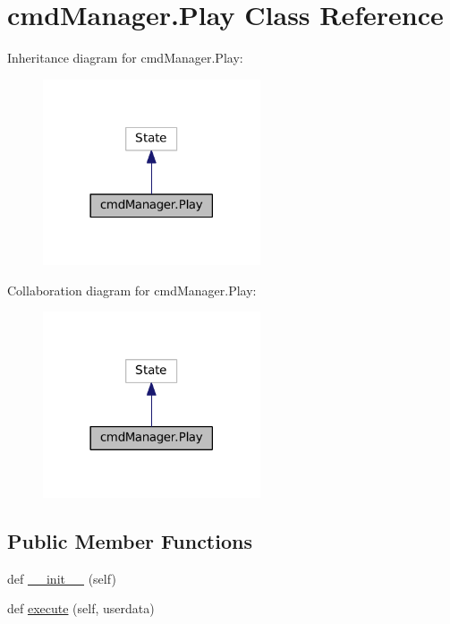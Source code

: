 \hypertarget{classcmdManager_1_1Play}{}\section{cmd\+Manager.\+Play Class Reference}
\label{classcmdManager_1_1Play}


Inheritance diagram for cmd\+Manager.\+Play\+:\nopagebreak
\begin{figure}[H]
\begin{center}
\leavevmode
\includegraphics[width=182pt]{classcmdManager_1_1Play__inherit__graph}
\end{center}
\end{figure}


Collaboration diagram for cmd\+Manager.\+Play\+:\nopagebreak
\begin{figure}[H]
\begin{center}
\leavevmode
\includegraphics[width=182pt]{classcmdManager_1_1Play__coll__graph}
\end{center}
\end{figure}
\subsection*{Public Member Functions}
\begin{DoxyCompactItemize}
\item 
def \hyperlink{classcmdManager_1_1Play_a4d2579c5fbfe43cfbeb085a149813ed3}{\+\_\+\+\_\+init\+\_\+\+\_\+} (self)
\item 
def \hyperlink{classcmdManager_1_1Play_a6e2839da28e556dc522779a43952eb1a}{execute} (self, userdata)
\end{DoxyCompactItemize}

